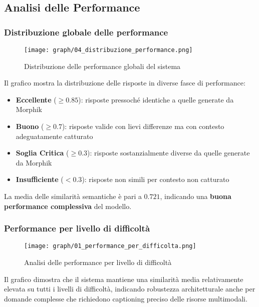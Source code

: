 \documentclass[12pt,a4paper]{article}
\begin{document}
\subsection{Analisi delle Performance}

\subsubsection{Distribuzione globale delle performance}
\begin{figure}[H]
\centering
\texttt{[image: graph/04\_distribuzione\_performance.png]}
\caption{Distribuzione delle performance globali del sistema}
\label{fig:global_performance}
\end{figure}

Il grafico mostra la distribuzione delle risposte in diverse fasce di performance:

\begin{itemize}
    \item \textbf{Eccellente} (\(\geq0.85\)): risposte pressoché identiche a quelle generate da Morphik
    \item \textbf{Buono} (\(\geq0.7\)): risposte valide con lievi differenze ma con contesto adeguatamente catturato
    \item \textbf{Soglia Critica} (\(\geq0.3\)): risposte sostanzialmente diverse da quelle generate da Morphik
    \item \textbf{Insufficiente} (\(<0.3\)): risposte non simili per contesto non catturato
\end{itemize}

La media delle similarità semantiche è pari a $0.721$, indicando una \textbf{buona performance complessiva} del modello.

\subsubsection{Performance per livello di difficoltà}
\begin{figure}[H]
\centering
\texttt{[image: graph/01\_performance\_per\_difficolta.png]}
\caption{Analisi delle performance per livello di difficoltà}
\label{fig:difficulty_performance}
\end{figure}

Il grafico dimostra che il sistema mantiene una similarità media relativamente elevata su tutti i livelli di difficoltà, indicando robustezza architetturale anche per domande complesse che richiedono captioning preciso delle risorse multimodali.
\end{document}
